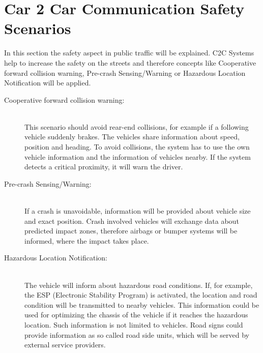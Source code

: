 \section{Car 2 Car Communication Safety Scenarios}
\label{sec:C2CSafetyScenarios}
In this section the safety aspect in public traffic will be explained. C2C Systems help to increase the safety on the streets and therefore concepts like Cooperative forward collision warning, Pre-crash Sensing/Warning or Hazardous Location Notification will be applied.\\
\begin{description}
  \item[Cooperative forward collision warning:] \hfill \\ This scenario should avoid rear-end collisions, for example if a following vehicle suddenly brakes. The vehicles share information about speed, position and heading. To avoid collisions, the system has to use the own vehicle information and the information of vehicles nearby. If the system detects a critical proximity, it will warn the driver.
  \item[Pre-crash Sensing/Warning:] \hfill \\ If a crash is unavoidable, information will be provided about vehicle size and exact position. Crash involved vehicles will exchange data about predicted impact zones, therefore airbags or bumper systems will be informed, where the impact takes place. 
  \item[Hazardous Location Notification:] \hfill \\ The vehicle will inform about hazardous road conditions. If, for example, the ESP (Electronic Stability Program) is activated, the location and road condition will be transmitted to nearby vehicles. This information could be used for optimizing the chassis of the vehicle if it reaches the hazardous location. Such information is not limited to vehicles. Road signs could provide information as so called road side units, which will be served by external service providers. 
\end{description}	

